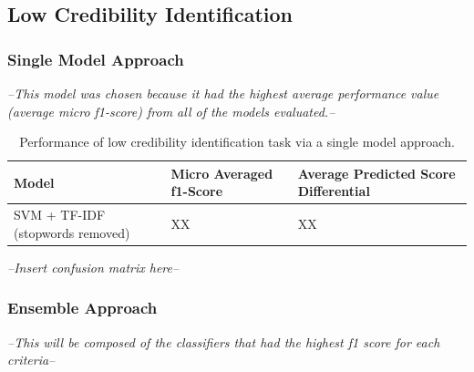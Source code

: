 \documentclass[a4paper,twoside,phd]{BYUPhys}
\begin{document}
\subsection{Low Credibility Identification}
\label{sec:LowCredibilityIdentificationResults}

\subsubsection{Single Model Approach}
\label{sec:SingleModelApproachResults}

\textit{--This model was chosen because it had the highest average performance value (average micro f1-score) from all of the models evaluated.--}
\begin{table}[H]
	\centering
	
	\begin{tabular}{|p{4cm}|p{4cm}|p{4cm}|}
		\hline
		
		\textbf{Model} & \textbf{Micro Averaged \newline f1-Score} & \textbf{Average Predicted Score Differential}                                                                                                                                                                                                                                                                                                                                           \\
		\hline                                                                                                                                              
		
		SVM + TF-IDF \newline (stopwords removed)  & XX & XX \\
		\hline
		
		
		
	\end{tabular}
	\caption{Performance of low credibility identification task via a single model approach.}
	\label{table:SingleModelApproach}
\end{table}

\textit{--Insert confusion matrix here--}

\subsubsection{Ensemble Approach}
\label{sec:EnsembleApproachResults}

\textit{--This will be composed of the classifiers that had the highest f1 score for each criteria--}
\end{document}
